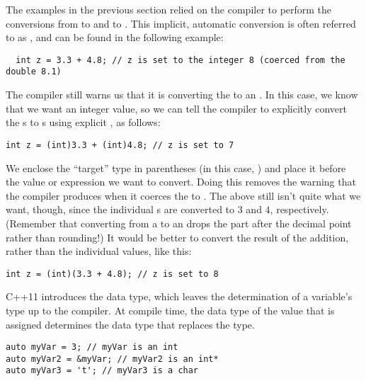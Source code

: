 
The examples in the previous section relied on the compiler to perform the conversions from  to  and  to . 
This implicit, automatic conversion is often referred to as , and can be found in the following example:

\begin{lstlisting}
  int z = 3.3 + 4.8; // z is set to the integer 8 (coerced from the double 8.1)
\end{lstlisting}

The compiler still warns us that it is converting the  to an . 
In this case, we know that we want an integer value, so we can tell the compiler to explicitly convert the s to s using explicit , as follows:

\begin{lstlisting}
int z = (int)3.3 + (int)4.8; // z is set to 7
\end{lstlisting}

We enclose the ``target'' type in parentheses (in this case, ) and place it before the value or expression we want to convert. 
Doing this removes the warning that the compiler produces when it coerces the  to . 
The above still isn't quite what we want, though, since the individual s are converted to $3$ and $4$, respectively. 
(Remember that converting from a  to an  drops the part after the decimal point rather than rounding!) 
It would be better to convert the result of the addition, rather than the individual values, like this:

\begin{lstlisting}
int z = (int)(3.3 + 4.8); // z is set to 8
\end{lstlisting}


C++11 introduces the  data type, which leaves the determination of a variable's type up to the compiler. 
At compile time, the data type of the value that is assigned determines the data type that replaces the  type.

\begin{lstlisting}
auto myVar = 3; // myVar is an int
auto myVar2 = &myVar; // myVar2 is an int*
auto myVar3 = 't'; // myVar3 is a char
\end{lstlisting}

